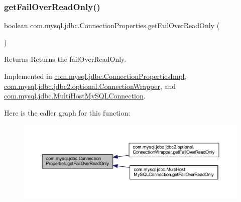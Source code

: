 \subsubsection{\texorpdfstring{get\+Fail\+Over\+Read\+Only()}{getFailOverReadOnly()}}
{\footnotesize\ttfamily boolean com.\+mysql.\+jdbc.\+Connection\+Properties.\+get\+Fail\+Over\+Read\+Only (\begin{DoxyParamCaption}{ }\end{DoxyParamCaption})}

\begin{DoxyReturn}{Returns}
Returns the fail\+Over\+Read\+Only. 
\end{DoxyReturn}


Implemented in \mbox{\hyperlink{classcom_1_1mysql_1_1jdbc_1_1_connection_properties_impl_acc467008bf52946ef7c6b3d3d9b6f390}{com.\+mysql.\+jdbc.\+Connection\+Properties\+Impl}}, \mbox{\hyperlink{classcom_1_1mysql_1_1jdbc_1_1jdbc2_1_1optional_1_1_connection_wrapper_a04fd603d5a300468472f5ddc26e5a56c}{com.\+mysql.\+jdbc.\+jdbc2.\+optional.\+Connection\+Wrapper}}, and \mbox{\hyperlink{classcom_1_1mysql_1_1jdbc_1_1_multi_host_my_s_q_l_connection_a2fdb31070906a426372d786d4f931034}{com.\+mysql.\+jdbc.\+Multi\+Host\+My\+S\+Q\+L\+Connection}}.

Here is the caller graph for this function\+:\nopagebreak
\begin{figure}[H]
\begin{center}
\leavevmode
\includegraphics[width=350pt]{interfacecom_1_1mysql_1_1jdbc_1_1_connection_properties_a14f395dcf2b5c008aef09513895925f7_icgraph}
\end{center}
\end{figure}
\mbox{\label{interfacecom_1_1mysql_1_1jdbc_1_1_connection_properties_a90f58aa61c84d2072ba37c902aef8f9e}} 
